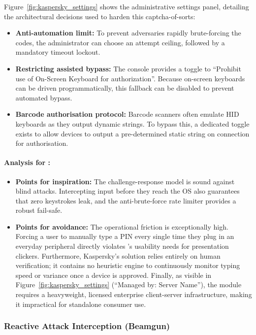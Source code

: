 Figure~\ref{fig:kaspersky_settings} shows the administrative settings panel, detailing the architectural decisions used to harden this captcha-of-sorts:
\begin{itemize}[leftmargin=*, nosep]
	\item \textbf{Anti-automation limit:} To prevent adversaries rapidly brute-forcing the codes, the administrator can choose an attempt ceiling, followed by a mandatory timeout lockout.
	\item \textbf{Restricting assisted bypass:} The console provides a toggle to
	      ``Prohibit use of On-Screen Keyboard for authorization''. Because on-screen keyboards can be driven programmatically, this fallback can be disabled to prevent automated bypass.
	\item \textbf{Barcode authorisation protocol:} Barcode scanners often emulate HID keyboards as they output dynamic strings. To bypass this, a dedicated toggle exists to allow devices to output a pre-determined static string on connection for authorisation.
\end{itemize}

\paragraph{Analysis for \projectNameFormatted :}
\begin{itemize}[leftmargin=*, nosep]
	\item \textbf{Points for inspiration:} The challenge-response model is sound against blind attacks. Intercepting input before they reach the OS also guarantees that zero keystrokes leak, and the anti-brute-force rate limiter provides a robust fail-safe.
	\item \textbf{Points for avoidance:} The operational friction is exceptionally high. Forcing a user to manually type a PIN every single time they plug in an everyday peripheral directly violates \stakeholdersTU's usability needs for presentation clickers. Furthermore, Kaspersky's solution relies entirely on human verification; it contains no heuristic engine to continuously monitor typing speed or variance once a device is approved. Finally, as visible in Figure~\ref{fig:kaspersky_settings} (``Managed by: Server Name''), the module requires a heavyweight, licensed enterprise client-server infrastructure, making it impractical for standalone consumer use.
\end{itemize}

\subsubsection{Reactive Attack Interception (Beamgun)}

